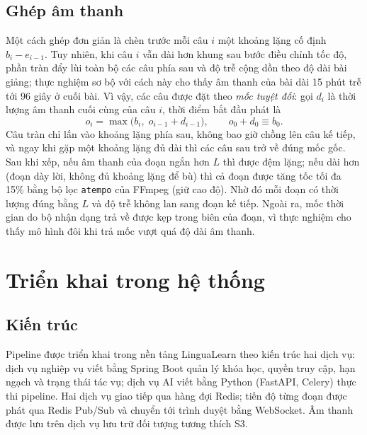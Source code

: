\documentclass{IEEEtran}
\begin{document}
\subsection{Ghép âm thanh}
\label{sub:concat}
Một cách ghép đơn giản là chèn trước mỗi câu $i$ một khoảng lặng cố định $b_i - e_{i-1}$. Tuy nhiên, khi câu $i$ vẫn dài hơn khung sau bước điều chỉnh tốc độ, phần tràn đẩy lùi toàn bộ các câu phía sau và độ trễ cộng dồn theo độ dài bài giảng; thực nghiệm sơ bộ với cách này cho thấy âm thanh của bài dài 15 phút trễ tới 96 giây ở cuối bài. Vì vậy, các câu được đặt theo \emph{mốc tuyệt đối}: gọi $d_i$ là thời lượng âm thanh cuối cùng của câu $i$, thời điểm bắt đầu phát là
\begin{equation}
o_i = \max\bigl(b_i,\; o_{i-1} + d_{i-1}\bigr), \qquad o_0 + d_0 \equiv b_0 .
\label{eq:onset}
\end{equation}
Câu tràn chỉ lấn vào khoảng lặng phía sau, không bao giờ chồng lên câu kế tiếp, và ngay khi gặp một khoảng lặng đủ dài thì các câu sau trở về đúng mốc gốc. Sau khi xếp, nếu âm thanh của đoạn ngắn hơn $L$ thì được đệm lặng; nếu dài hơn (đoạn dày lời, không đủ khoảng lặng để bù) thì cả đoạn được tăng tốc tối đa 15\% bằng bộ lọc \texttt{atempo} của FFmpeg (giữ cao độ). Nhờ đó mỗi đoạn có thời lượng đúng bằng $L$ và độ trễ không lan sang đoạn kế tiếp. Ngoài ra, mốc thời gian do bộ nhận dạng trả về được kẹp trong biên của đoạn, vì thực nghiệm cho thấy mô hình đôi khi trả mốc vượt quá độ dài âm thanh.

\section{Triển khai trong hệ thống}
\label{sec:impl}

\subsection{Kiến trúc}
Pipeline được triển khai trong nền tảng LinguaLearn theo kiến trúc hai dịch vụ: dịch vụ nghiệp vụ viết bằng Spring Boot quản lý khóa học, quyền truy cập, hạn ngạch và trạng thái tác vụ; dịch vụ AI viết bằng Python (FastAPI, Celery) thực thi pipeline. Hai dịch vụ giao tiếp qua hàng đợi Redis; tiến độ từng đoạn được phát qua Redis Pub/Sub và chuyển tới trình duyệt bằng WebSocket. Âm thanh được lưu trên dịch vụ lưu trữ đối tượng tương thích S3.
\end{document}
